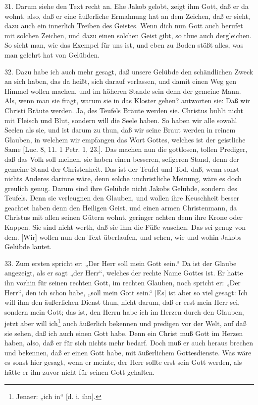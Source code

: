 31. Darum siehe den Text recht an. Ehe Jakob gelobt, zeigt ihm Gott, daß er da wohnt, also, daß er eine äußerliche Ermahnung hat an dem Zeichen, daß er sieht, dazu auch ein innerlich Treiben des Geistes. Wenn dich nun Gott auch berufet mit solchen Zeichen, und dazu einen solchen Geist gibt, so thue auch dergleichen. So sieht man, wie das Exempel für uns ist, und eben zu Boden stößt alles, was man gelehrt hat von Gelübden.

32. Dazu habe ich auch mehr gesagt, daß unsere Gelübde den schändlichen Zweck an sich haben, das da heißt, sich darauf verlassen, und damit einen Weg gen Himmel wollen machen, und im höheren Stande sein denn der gemeine Mann. Als, wenn man sie fragt, warum sie in das Kloster gehen? antworten sie: Daß wir Christi Bräute werden. Ja, des Teufels Bräute werden sie. Christus buhlt nicht mit Fleisch und Blut, sondern will die Seele haben. So haben wir alle sowohl Seelen als sie, und ist darum zu thun, daß wir seine Braut werden in reinem Glauben, in welchem wir empfangen das Wort Gottes, welches ist der geistliche Same [Luc. 8, 11. 1 Petr. 1, 23.]. Das machen nun die gottlosen, tollen Prediger, daß das Volk soll meinen, sie haben einen besseren, seligeren Stand, denn der gemeine Stand der Christenheit. Das ist der Teufel und Tod, daß, wenn sonst nichts Anderes darinne wäre, denn solche unchristliche Meinung, wäre es doch greulich genug. Darum sind ihre Gelübde nicht Jakobs Gelübde, sondern des Teufels. Denn sie verleugnen den Glauben, und wollen ihre Keuschheit besser geachtet haben denn den Heiligen Geist, und einen armen Christenmann, da Christus mit allen seinen Gütern wohnt, geringer achten denn ihre Krone oder Kappen. Sie sind nicht werth, daß sie ihm die Füße waschen. Das sei genug von dem. [Wir] wollen nun den Text überlaufen, und sehen, wie und wohin Jakobs Gelübde lautet.

33. Zum ersten spricht er: „Der Herr soll mein Gott sein.“ Da ist der Glaube angezeigt, als er sagt „der Herr“, welches der rechte Name Gottes ist. Er hatte ihn vorhin für seinen rechten Gott, im rechten Glauben, noch spricht er: „Der Herr“, den ich schon habe, „soll mein Gott sein.“ [Es] ist aber so viel gesagt: Ich will ihm den äußerlichen Dienst thun, nicht darum, daß er erst mein Herr sei, sondern mein Gott; das ist, den Herrn habe ich im Herzen durch den Glauben, jetzt aber will ich\footnote{Jenaer: „ich in“ [d. i. ihn].} auch äußerlich bekennen und predigen vor der Welt, auf daß sie sehen, daß ich auch einen Gott habe. Denn ein Christ muß Gott im Herzen haben, also, daß er für sich nichts mehr bedarf. Doch muß er auch heraus brechen und bekennen, daß er einen Gott habe, mit äußerlichem Gottesdienste. Was wäre es sonst hier gesagt, wenn er meinte, der Herr sollte erst sein Gott werden, als hätte er ihn zuvor nicht für seinen Gott gehalten.

